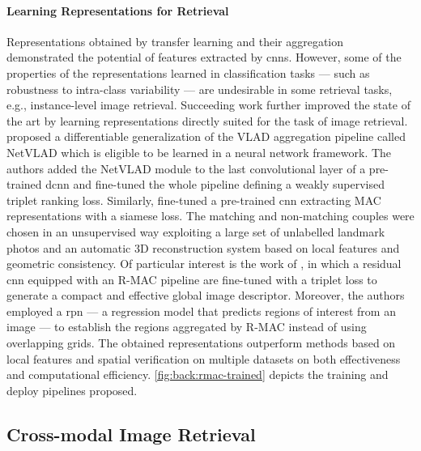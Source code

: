 \paragraph{Learning Representations for Retrieval}
Representations obtained by transfer learning and their aggregation demonstrated the potential of features extracted by \glspl{cnn}.
However, some of the properties of the representations learned in classification tasks --- such as robustness to intra-class variability --- are undesirable in some retrieval tasks, e.g., instance-level image retrieval.
Succeeding work further improved the state of the art by learning representations directly suited for the task of image retrieval.
\citet{arandjelovic2016netvlad} proposed a differentiable generalization of the VLAD aggregation pipeline called NetVLAD which is eligible to be learned in a neural network framework.
The authors added the NetVLAD module to the last convolutional layer of a pre-trained \gls{dcnn} and fine-tuned the whole pipeline defining a weakly supervised triplet ranking loss.
Similarly, \citet{radenovic2016cnn} fine-tuned a pre-trained \gls{cnn} extracting MAC representations with a siamese loss.
The matching and non-matching couples were chosen in an unsupervised way exploiting a large set of unlabelled landmark photos and an automatic 3D reconstruction system based on local features and geometric consistency.
Of particular interest is the work of \citet{gordo2016deep,gordo2017end}, in which a residual \gls{cnn} equipped with an R-MAC pipeline are fine-tuned with a triplet loss to generate a compact and effective global image descriptor.
Moreover, the authors employed a \gls{rpn} --- a regression model that predicts regions of interest from an image --- to establish the regions aggregated by R-MAC instead of using overlapping grids.
The obtained representations outperform methods based on local features and spatial verification on multiple datasets on both effectiveness and computational efficiency.
\ref{fig:back:rmac-trained} depicts the training and deploy pipelines proposed.

\subsection{Cross-modal Image Retrieval}

